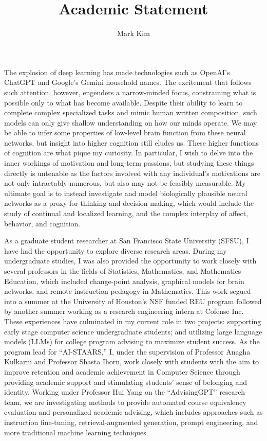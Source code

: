 \documentclass[12pt]{article}
\author{Mark Kim}
\title{Academic Statement}
\begin{document}
\maketitle
The explosion of deep learning has made technologies such as OpenAI's ChatGPT and Google's Gemini household names.  The excitement that
follows such attention, however, engenders a narrow-minded focus, constraining what is possible only to what has become available.  Despite
their ability to learn to complete complex specialized tasks and mimic human written composition, such models can only give shallow
understanding on how our minds  operate. We may be able to infer some properties of low-level brain function from these neural networks, but
insight into higher cognition still eludes us.  These higher functions of cognition are what pique my curiosity.  In particular, I wish to
delve into the inner workings of motivation and long-term passions, but studying these things directly is untenable as the factors involved
with any individual's motivations are not only intractably numerous, but also may not be feasibly measurable.  My ultimate goal is to
instead investigate and model biologically plausible neural networks as a proxy for thinking and decision making, which would include the
study of continual and localized learning, and the complex interplay of affect, behavior, and cognition.

As a graduate student researcher at San Francisco State University (SFSU), I have had the opportunity to explore diverse research areas.
During my undergraduate studies, I was also provided the opportunity to work closely with several professors in the fields of Statistics,
Mathematics, and Mathematics Education, which included change-point analysis, graphical models for brain networks, and remote instruction
pedagogy in Mathematics.  This work segued into a summer at the University of Houston's NSF funded REU program followed by another summer
working as a research engineering intern at Cofense Inc.  These experiences have culminated in my current role in two projects: supporting
early stage computer science undergraduate students; and utilizing large language models (LLMs) for college program advising to maximize
student success.  As the program lead for ``AI-STAARS,'' I, under the supervision of Professor Anagha Kulkarni and Professor Shasta Ihorn,
work closely with students with the aim to improve retention and academic achievement in Computer Science through providing academic support
and stimulating students' sense of belonging and identity.  Working under Professor Hui Yang on the ``AdvisingGPT'' research team, we are
investigating methods to provide automated course equivalency evaluation and personalized academic advising, which includes approaches such
as instruction fine-tuning, retrieval-augmented generation, prompt engineering, and more traditional machine learning techniques.
\end{document}
